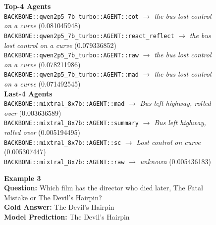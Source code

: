 \documentclass[11pt]{article}
\begin{document}
\begin{figure}[t]
\begin{tcolorbox}[colback=myblue!5!white,
                  colframe=myblue!75!black,
                  title=Agent Routing Examples (Three QA Cases)]
{\vspace{4pt}
\textbf{Top-4 Agents}\\
\texttt{BACKBONE::qwen2p5\_7b\_turbo::AGENT::cot} $\rightarrow$ \emph{the bus lost control on a curve} (0.081045948)\\
\texttt{BACKBONE::qwen2p5\_7b\_turbo::AGENT::react\_reflect} $\rightarrow$ \emph{the bus lost control on a curve} (0.079336852)\\
\texttt{BACKBONE::qwen2p5\_7b\_turbo::AGENT::raw} $\rightarrow$ \emph{the bus lost control on a curve} (0.078211986)\\
\texttt{BACKBONE::qwen2p5\_7b\_turbo::AGENT::mad} $\rightarrow$ \emph{the bus lost control on a curve} (0.071492545)\\[4pt]
\textbf{Last-4 Agents}\\
\texttt{BACKBONE::mixtral\_8x7b::AGENT::mad} $\rightarrow$ \emph{Bus left highway, rolled over} (0.003636589)\\
\texttt{BACKBONE::mixtral\_8x7b::AGENT::summary} $\rightarrow$ \emph{Bus left highway, rolled over} (0.005194495)\\
\texttt{BACKBONE::mixtral\_8x7b::AGENT::sc} $\rightarrow$ \emph{Lost control on curve} (0.005307447)\\
\texttt{BACKBONE::mixtral\_8x7b::AGENT::raw} $\rightarrow$ \emph{unknown} (0.005436183)

\vspace{10pt}
\textbf{Example 3}\\
\textbf{Question:} Which film has the director who died later, The Fatal Mistake or The Devil's Hairpin?\\
\textbf{Gold Answer:} The Devil's Hairpin\\
\textbf{Model Prediction:} The Devil's Hairpin

}
\end{tcolorbox}
\end{figure}
\end{document}
